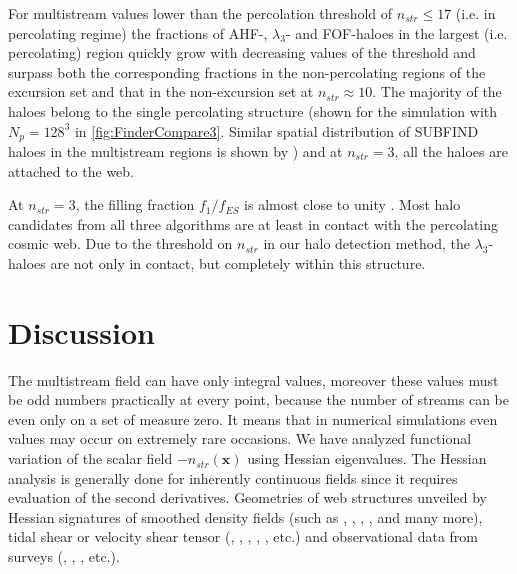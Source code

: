 For multistream values lower than the percolation threshold of $n_{str} \le 17$ (i.e. in percolating regime) the fractions of AHF-, $\lambda_3$-  and FOF-haloes in the largest (i.e. percolating) region quickly grow with decreasing values of the threshold and surpass both the corresponding fractions in the non-percolating  regions of the excursion set and that in the non-excursion set
at $n_{str} \approx 10$. The majority of the haloes belong to the single percolating structure (shown for the simulation with $N_p=128^3$ in \autoref{fig:FinderCompare3}. Similar spatial distribution of SUBFIND haloes \citealt{Springel2001a} in the multistream regions is shown by \citealt{Aragon-Calvo2016}) and at $n_{str} = 3$, all the haloes are attached to the web.  

At $n_{str} = 3$, the filling fraction $f_1 / f_{ES}$ is almost close to unity \cite{Ramachandra2017}. Most halo candidates from all three algorithms are at least in contact with the percolating cosmic web. Due to the threshold on $n_{str}$ in our halo detection method, the $\lambda_3$-haloes are not only in contact, but completely within this structure. 



\section{Discussion}
\label{sec:discussion}



The multistream field can have only integral  values, moreover these values must be odd numbers practically at every point, because the number of streams can be even only on a set of measure zero. It means that in numerical simulations  even values may occur on extremely rare occasions. 
We have analyzed functional variation of the scalar field $-n_{str}(\mathbf{x})$ using Hessian eigenvalues. The Hessian analysis is generally done for inherently continuous fields since it requires  evaluation of the second derivatives. %
Geometries of web structures unveiled by Hessian signatures of smoothed density fields (such as \citealt{Sousbie2008a}, \citealt{Aragon-Calvo2007}, \citealt{Aragon-Calvo2010a}, \citealt{Cautun2014a}, \citealt{Bond2010a} and many more), tidal shear or velocity shear tensor (\citealt{Hahn2007}, \citealt{Forero-Romero2009a}, \citealt{Hoffman2012a}, \citealt{Hoffman2012a}, \citealt{Libeskind2013}, \citealt{Cautun2014a} etc.) and observational data from surveys (\citealt{Sousbie2008a}, \citealt{Bond2010a}, \citealt{Bond2010b}, \citealt{Pahwa2016} etc.). 


